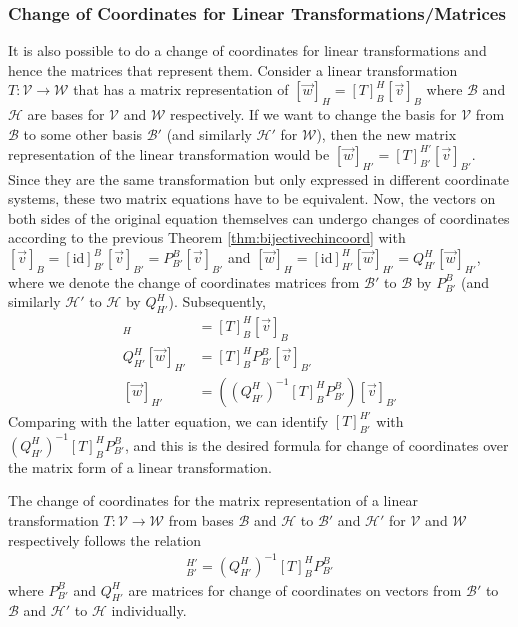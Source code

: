 \subsubsection{Change of Coordinates for Linear Transformations/Matrices}

It is also possible to do a change of coordinates for linear transformations and hence the matrices that represent them. Consider a linear transformation $T: \mathcal{V} \to \mathcal{W}$ that has a matrix representation of $[\vec{w}]_H = [T]_B^H[\vec{v}]_B$ where $\mathcal{B}$ and $\mathcal{H}$ are bases for $\mathcal{V}$ and $\mathcal{W}$ respectively. If we want to change the basis for $\mathcal{V}$ from $\mathcal{B}$ to some other basis $\mathcal{B}'$ (and similarly $\mathcal{H}'$ for $\mathcal{W}$), then the new matrix representation of the linear transformation would be $[\vec{w}]_{H'} = [T]_{B'}^{H'}[\vec{v}]_{B'}$. Since they are the same transformation but only expressed in different coordinate systems, these two matrix equations have to be equivalent. Now, the vectors on both sides of the original equation themselves can undergo changes of coordinates according to the previous Theorem \ref{thm:bijectivechincoord} with $[\vec{v}]_B = [\text{id}]_{B'}^B [\vec{v}]_{B'} = P_{B'}^B [\vec{v}]_{B'}$ and $[\vec{w}]_{H} = [\text{id}]_{H'}^{H} [\vec{w}]_{H'} = Q_{H'}^H [\vec{w}]_{H'}$, where we denote the change of coordinates matrices from $\mathcal{B'}$ to $\mathcal{B}$ by $P_{B'}^{B}$ (and similarly  $\mathcal{H'}$ to $\mathcal{H}$ by $Q_{H'}^{H}$). Subsequently,
\begin{align*}
[\vec{w}]_H &= [T]_B^H[\vec{v}]_B \\
Q_{H'}^H [\vec{w}]_{H'} &= [T]_B^H P_{B'}^B [\vec{v}]_{B'} \\
[\vec{w}]_{H'} &= \left( (Q_{H'}^H)^{-1} [T]_B^H P_{B'}^B \right) [\vec{v}]_{B'}
\end{align*}
Comparing with the latter equation, we can identify $[T]_{B'}^{H'}$ with $(Q_{H'}^H)^{-1} [T]_B^H P_{B'}^B$, and this is the desired formula for change of coordinates over the matrix form of a linear transformation.
\begin{proper}
\label{proper:chcoordsmat}
The change of coordinates for the matrix representation of a linear transformation $T: \mathcal{V} \to \mathcal{W}$ from bases $\mathcal{B}$ and $\mathcal{H}$ to $\mathcal{B}'$ and $\mathcal{H}'$ for $\mathcal{V}$ and $\mathcal{W}$ respectively follows the relation
\begin{align*}
[T]_{B'}^{H'} = (Q_{H'}^H)^{-1} [T]_B^H P_{B'}^B
\end{align*}
where $P_{B'}^{B}$ and $Q_{H'}^{H}$ are matrices for change of coordinates on vectors from $\mathcal{B'}$ to $\mathcal{B}$ and $\mathcal{H'}$ to $\mathcal{H}$ individually.
\end{proper}
